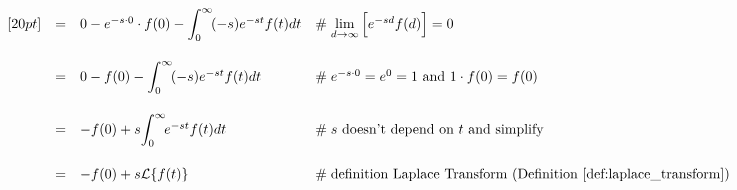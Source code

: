 \documentclass{article}
\theoremstyle{definition}
\begin{document}
\begin{equation*}
\begin{array}{lllll}
[20pt]                                                                                                                                                                                              %
&=& 0  - e^{-s \cdot 0} \cdot f(0)  - \mathlarger{\int}^\infty_0 \!  (-s) e^{-st}  f(t) dt                                                                          &\mathrel{\#} \lim\limits_{d \to \infty}\Big [e^{-sd} f(d) \Big ] = 0                                         \\
[20pt]                                                                                                                                                                                              %
&=& 0 - f(0) - \mathlarger{\int}^\infty_0 \!  (-s) e^{-st}  f(t) dt                                                                                                           &\mathrel{\#} e^{-s \cdot 0} = e^0 = 1 \text{ and } 1 \cdot f(0) = f(0)                                  \\
[20pt]                                                                                                                                                                                              %
&=& -f(0) + s \mathlarger{\int}^\infty_0 \!  e^{-st}  f(t) dt                                                                                                                  &\mathrel{\#} \text{$s$ doesn't depend on $t$ and simplify}                                             \\
[20pt]                                                                                                                                                                                              %
&=& -f(0) + s \mathcal{L}\{f(t)\}                                                                                                                                                       &\mathrel{\#} \text{definition Laplace Transform (Definition \ref{def:laplace_transform})} \\ 

\end{array}
\end{equation*}
\end{document}
